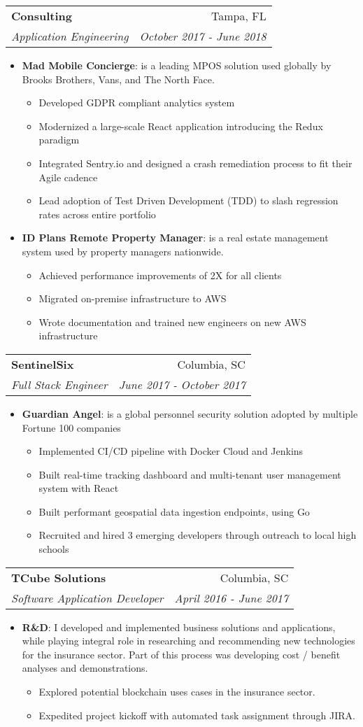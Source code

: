 \documentclass[a4paper]{article}
\makeatletter
\newcommand{\resumeItem}[2]{
  \item\small{
    \textbf{#1}{: #2 \vspace{-2pt}}
  }
}
\newcommand{\resumeSubheading}[4]{
  \vspace{-1pt}\item
    \begin{tabular*}{0.97\textwidth}[t]{l@{\extracolsep{\fill}}r}
      \textbf{#1} & #2 \\
      \textit{\small#3} & \textit{\small #4} \\
    \end{tabular*}\vspace{-5pt}
}
\newcommand{\resumeItemListStart}{\begin{itemize}}
\newcommand{\resumeItemListEnd}{\end{itemize}\vspace{-5pt}}
\makeatother
\begin{document}
	\resumeSubheading
		{Consulting}{Tampa, FL}
		{Application Engineering}{October 2017 - June 2018}
		\resumeItemListStart
			\resumeItem{Mad Mobile Concierge}
				{is a leading MPOS solution used globally by Brooks Brothers, Vans, and The North Face.}
				\begin{itemize}
					\item Developed GDPR compliant analytics system
					\item Modernized a large-scale React application introducing the Redux paradigm
					\item Integrated Sentry.io and designed a crash remediation process to fit their Agile cadence
					\item Lead adoption of Test Driven Development (TDD) to slash regression rates across entire portfolio
				\end{itemize}
			\resumeItem{ID Plans Remote Property Manager}
				{is a real estate management system used by property managers nationwide.}
				\begin{itemize}
					\item Achieved performance improvements of 2X for all clients
					\item Migrated on-premise infrastructure to AWS
					\item Wrote documentation and trained new engineers on new AWS infrastructure
				\end{itemize}
		\resumeItemListEnd

	\resumeSubheading
		{SentinelSix}{Columbia, SC}
		{Full Stack Engineer}{June 2017 - October 2017}
		\resumeItemListStart
			\resumeItem{Guardian Angel}{is a global personnel security solution adopted by multiple Fortune 100 companies}
			\begin{itemize}
             \item Implemented CI/CD pipeline with Docker Cloud and Jenkins
             \item Built real-time tracking dashboard and multi-tenant user management system with React
             \item Built performant geospatial data ingestion endpoints, using Go
             \item Recruited and hired 3 emerging developers through outreach to local high schools
            \end{itemize}
		\resumeItemListEnd

\resumeSubheading
		{TCube Solutions}{Columbia, SC}
		{Software Application Developer}{April 2016 - June 2017}
		\resumeItemListStart
    		\resumeItem{R\&D}{I developed and implemented business solutions and applications, while playing integral role in researching and recommending new technologies for the insurance sector. Part of this process was developing cost / benefit analyses and demonstrations.}
		\begin{itemize}
                \item Explored potential blockchain uses cases in the insurance sector.
                \item Expedited project kickoff with automated task assignment through JIRA.
            \end{itemize}
		\resumeItemListEnd
\end{document}
